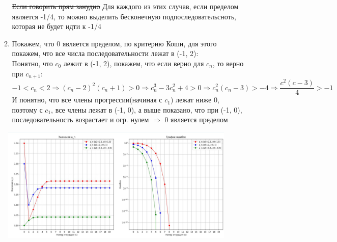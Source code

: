 \documentclass{report}
\begin{document}
\begin{enumerate}
\begin{enumerate}
        \sout{Если говорить прям занудно} Для каждого из этих случав, если пределом является -1/4, то можно выделить бесконечную подпоследовательсноть, которая не будет идти к -1/4
    \item 
        Покажем, что 0 является пределом, по критерию Коши, для этого покажем, что все числа последовательности лежат в (-1, 2):\\
        Понятно, что $c_0$ лежит в (-1, 2), покажем, что если верно для $c_n$, то верно при $c_{n+1}$:
        \begin{equation*}
            -1<c_n<2 \Rightarrow (c_n-2)^2(c_n+1)>0 \Rightarrow c_n^3-3c_n^2+4>0 \Rightarrow c_n^2(c_n-3)>-4 \Rightarrow \dfrac{c^2(c-3)}{4}>-1
        \end{equation*}
        И понятно, что все члены прогрессии(начиная с $c_1$) лежат ниже 0, поэтому с $c_1$, все члены лежат в (-1, 0), а выше показано, что при (-1, 0), последовательность возрастает и огр. нулем $\Rightarrow$ 0 является пределом
        \end{enumerate}
\end{enumerate}
\begin{figure}[H]
\begin{center}

\includegraphics[scale=0.5]{21.png}
\end{center}
\end{figure}
\end{document}
